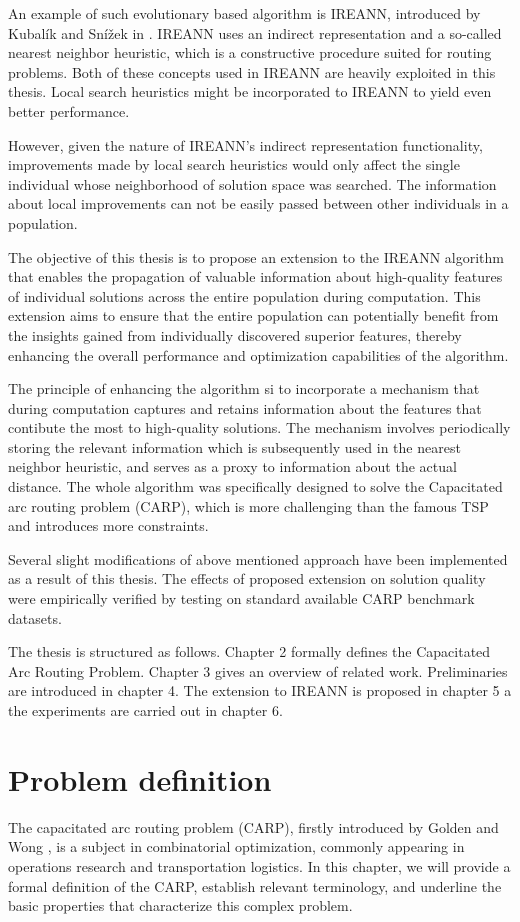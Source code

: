 \documentclass[twoside]{ctuthesis}
\theoremstyle{plain}
\theoremstyle{definition}
\theoremstyle{note}
\begin{document}
An example of such evolutionary based algorithm is IREANN, introduced by Kubalík and Snížek in \cite{kubalik2014novel}. IREANN uses an indirect representation and a so-called nearest neighbor heuristic, which is a constructive procedure suited for routing problems. Both of these concepts used in IREANN are heavily exploited in this thesis. Local search heuristics might be incorporated to IREANN to yield even better performance.

However, given the nature of IREANN's indirect representation functionality, improvements made by local search heuristics would only affect the single individual whose neighborhood of solution space was searched. The information about local improvements can not be easily passed between other individuals in a population. 

The objective of this thesis is to propose an extension to the IREANN algorithm that enables the propagation of valuable information about high-quality features of individual solutions across the entire population during computation. This extension aims to ensure that the entire population can potentially benefit from the insights gained from individually discovered superior features, thereby enhancing the overall performance and optimization capabilities of the algorithm.

The principle of enhancing the algorithm si to incorporate a mechanism that during computation captures and retains information about the features that contibute the most to high-quality solutions. The mechanism involves periodically storing the relevant information which is subsequently used in the nearest neighbor heuristic, and serves as a proxy to information about the actual distance. The whole algorithm was specifically designed to solve the Capacitated arc routing problem (CARP), which is more challenging than the famous TSP and introduces more constraints.

Several slight modifications of above mentioned approach have been implemented as a result of this thesis. The effects of proposed extension on solution quality were empirically verified by testing on standard available CARP benchmark datasets.

The thesis is structured as follows. Chapter 2 formally defines the Capacitated Arc Routing Problem. Chapter 3 gives an overview of related work. Preliminaries are introduced in chapter 4. The extension to IREANN is proposed in chapter 5 a the experiments are carried out in chapter 6.

\chapter{Problem definition}
The capacitated arc routing problem (CARP), firstly introduced by Golden and Wong \cite{golden1981capacitated}, is a subject in combinatorial optimization, commonly appearing in operations research and transportation logistics. In this chapter, we will provide a formal definition of the CARP, establish relevant terminology, and underline the basic properties that characterize this complex problem.
\end{document}
